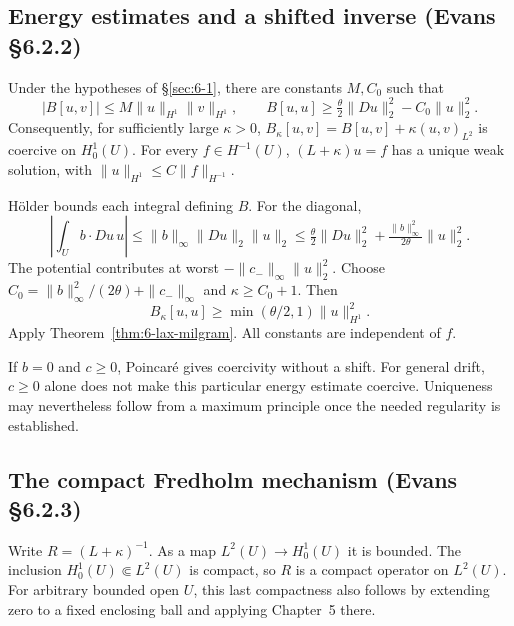 \subsection{Energy estimates and a shifted inverse (Evans \S6.2.2)}
\begin{theorem}\label{thm:6-garding}
Under the hypotheses of \S\ref{sec:6-1}, there are constants $M,C_0$
such that
\[
 |B[u,v]|\leq M\|u\|_{H^1}\|v\|_{H^1},\qquad
 B[u,u]\geq\tfrac{\theta}{2}\|Du\|_2^2-C_0\|u\|_2^2.
\]
Consequently, for sufficiently large $\kappa>0$,
$B_\kappa[u,v]=B[u,v]+\kappa(u,v)_{L^2}$ is coercive on $H^1_0(U)$.
For every $f\in H^{-1}(U)$, $(L+\kappa)u=f$ has a unique weak solution,
with $\|u\|_{H^1}\leq C\|f\|_{H^{-1}}$.
\end{theorem}
\begin{expandedproof}
H\"older bounds each integral defining $B$. For the diagonal,
\[
 \left|\int_U b\cdot Du\,u\right|
 \leq\|b\|_\infty\|Du\|_2\|u\|_2
 \leq\tfrac{\theta}{2}\|Du\|_2^2+
       \tfrac{\|b\|_\infty^2}{2\theta}\|u\|_2^2 .
\]
The potential contributes at worst $-\|c_-\|_\infty\|u\|_2^2$.
Choose $C_0=\|b\|_\infty^2/(2\theta)+\|c_-\|_\infty$ and
$\kappa\geq C_0+1$. Then
\[
 B_\kappa[u,u]\geq
 \min(\theta/2,1)\|u\|_{H^1}^2.
\]
Apply Theorem~\ref{thm:6-lax-milgram}. All constants are independent of $f$.
\end{expandedproof}
\Needspace{45mm}
If $b=0$ and $c\geq0$, Poincar\'e gives coercivity without a shift.
For general drift, $c\geq0$ alone does not make this particular energy
estimate coercive. Uniqueness may nevertheless follow from a maximum
principle once the needed regularity is established.

\Needspace{35mm}
\subsection{The compact Fredholm mechanism (Evans \S6.2.3)}
Write $R=(L+\kappa)^{-1}$. As a map $L^2(U)\to H^1_0(U)$ it is bounded.
The inclusion $H^1_0(U)\Subset L^2(U)$ is compact, so $R$ is a compact
operator on $L^2(U)$. For arbitrary bounded open $U$, this last compactness
also follows by extending zero to a fixed enclosing ball and applying
Chapter~5 there.


\Needspace{45mm}

